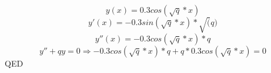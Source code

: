 \begin{equation}
  y(x)=0.3cos(\sqrt{q}*x)
\end{equation}
\begin{equation}
  y'(x)=-0.3sin(\sqrt{q}*x)*\sqrt(q)
\end{equation}
\begin{equation}
  y''(x)=-0.3cos(\sqrt{q}*x)*q
\end{equation}
\begin{equation}
  y'' + qy = 0 \Rightarrow -0.3cos(\sqrt{q}*x)*q+q*0.3cos(\sqrt{q}*x) = 0
\end{equation}
QED
